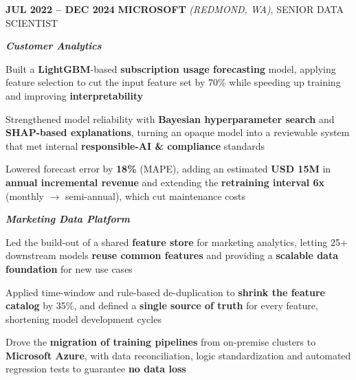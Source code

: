     \begin{twocolentry}{
        \textbf{JUL 2022 -- DEC 2024}
        }
        \textbf{MICROSOFT} \textit{(REDMOND, WA)}, SENIOR DATA SCIENTIST
    \end{twocolentry}
    \begin{onecolentry}
        \vspace{0.1 cm}
        \textit{\textbf{Customer Analytics}}
    \end{onecolentry}
    \begin{onecolentry}
        \begin{highlights}
            \item Built a \textbf{LightGBM}-based \textbf{subscription usage forecasting} model, applying feature selection to cut the input feature set by 70\% while speeding up training and improving \textbf{interpretability}
            \item Strengthened model reliability with \textbf{Bayesian hyperparameter search} and \textbf{SHAP-based explanations}, turning an opaque model into a reviewable system that met internal \textbf{responsible-AI \& compliance} standards
            \item Lowered forecast error by \textbf{18\%} (MAPE), adding an estimated \textbf{USD 15M} in \textbf{annual incremental revenue} and extending the \textbf{retraining interval 6x} (monthly $\rightarrow$ semi-annual), which cut maintenance costs
        \end{highlights}
    \end{onecolentry}
    \vspace{0.15 cm}
    \begin{onecolentry}
        \textit{\textbf{Marketing Data Platform}}
    \end{onecolentry}
    \begin{onecolentry}
        \begin{highlights}
            \item Led the build-out of a shared \textbf{feature store} for marketing analytics, letting 25+ downstream models \textbf{reuse common features} and providing a \textbf{scalable data foundation} for new use cases
            \item Applied time-window and rule-based de-duplication to \textbf{shrink the feature catalog} by 35\%, and defined a \textbf{single source of truth} for every feature, shortening model development cycles
            \item Drove the \textbf{migration of training pipelines} from on-premise clusters to \textbf{Microsoft Azure}, with data reconciliation, logic standardization and automated regression tests to guarantee \textbf{no data loss}
        \end{highlights}
    \end{onecolentry}
